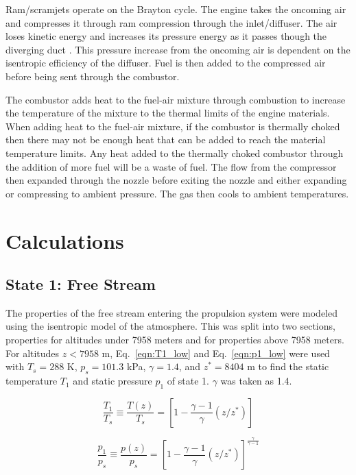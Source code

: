 \documentclass[conf]{new-aiaa} %
\begin{document}
Ram/scramjets operate on the Brayton cycle. The engine takes the oncoming air and compresses it through ram compression through the inlet/diffuser. The air loses kinetic energy and increases its pressure energy as it passes though the diverging duct \cite{rycey1996jetengine}. This pressure increase from the oncoming air is dependent on the isentropic efficiency of the diffuser. Fuel is then added to the compressed air before being sent through the combustor.

The combustor adds heat to the fuel-air mixture through combustion to increase the temperature of the mixture to the thermal limits of the engine materials. When adding heat to the fuel-air mixture, if the combustor is thermally choked then there may not be enough heat that can be added to reach the material temperature limits. Any heat added to the thermally choked combustor through the addition of more fuel will be a waste of fuel. The flow from the compressor then expanded through the nozzle before exiting the nozzle and either expanding or compressing to ambient pressure. The gas then cools to ambient temperatures.


\section{Calculations}
\subsection{State 1: Free Stream}
The properties of the free stream entering the propulsion system were modeled using the isentropic model of the atmosphere. This was split into two sections, properties for altitudes under 7958 meters and for properties above 7958 meters. For altitudes $z<7958$ m, Eq.~\eqref{eqn:T1_low} and Eq.~\eqref{eqn:p1_low} were used with $T_s=288$ K, $p_s=101.3$ kPa, $\gamma=1.4$, and $z^*=8404$ m to find the static temperature $T_1$ and static pressure $p_1$ of state 1. $\gamma$ was taken as 1.4.

\begin{equation}
    \label{eqn:T1_low}
    \frac{T_1}{T_s}\equiv\frac{T(z)}{T_s}=\left[1-\frac{\gamma-1}{\gamma}(z/z^*)\right]
\end{equation}

\begin{equation}
    \label{eqn:p1_low}
    \frac{p_1}{p_s}\equiv\frac{p(z)}{p_s}=\left[1-\frac{\gamma-1}{\gamma}(z/z^*)\right]^\frac{\gamma}{\gamma-1}
\end{equation}
\end{document}
